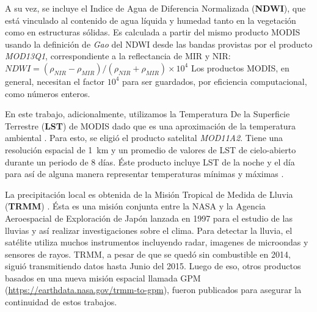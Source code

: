  \par A su vez, se incluye el Indice de Agua de Diferencia Normalizada
    (\textbf{NDWI}), que está vinculado al contenido de agua líquida y humedad
    tanto en la vegetación como en estructuras sólidas.
    Es calculada a partir del mismo producto MODIS usando la definición de
    \textit{Gao} \cite{gao_ndwi} del NDWI desde las bandas provistas por
    el producto \textit{MOD13Q1}, correspondiente a la reflectancia de MIR y NIR:
    $NDWI =  (\rho_{NIR} - \rho_{MIR}) / (\rho_{NIR}  + \rho_{MIR} ) \times 10^4$
    Los productos MODIS, en general, necesitan el factor $10^{4}$ para ser guardados,
    por eficiencia computacional, como números enteros.

  \par En este trabajo, adicionalmente, utilizamos la Temperatura De la Superficie
    Terrestre (\textbf{LST}) de MODIS dado que es una aproximación de la
    temperatura ambiental \cite{infectious_diseases, surface_temp, temp_algorithm}.
    Para esto, se eligió el producto satelital \textit{MOD11A2}. Tiene una
    resolución espacial de \SI{1}{\kilo\meter} y un promedio de valores de
    LST de cielo-abierto durante un periodo de 8 días. Éste producto incluye
    LST de la noche y el día para así de alguna manera representar
    temperaturas mínimas y máximas \cite{lst_surface}.

  \par La precipitación local es obtenida de la Misión Tropical de Medida de Lluvia
    (\textbf{TRMM}) \cite{trmm_mision}. Ésta es una misión conjunta entre la
    NASA y la Agencia Aeroespacial de Exploración de Japón lanzada en 1997
    para el estudio de las lluvias y así realizar investigaciones sobre el
    clima. Para detectar la lluvia, el satélite utiliza muchos instrumentos
    incluyendo radar, imagenes de microondas y sensores de rayos. TRMM, a pesar
    de que se quedó sin combustible en 2014, siguió transmitiendo datos hasta
    Junio del 2015.
    Luego de eso, otros productos basados en una nueva misión espacial llamada
    GPM (\url{https://earthdata.nasa.gov/trmm-to-gpm}), fueron publicados para
    asegurar la continuidad de estos trabajos.


